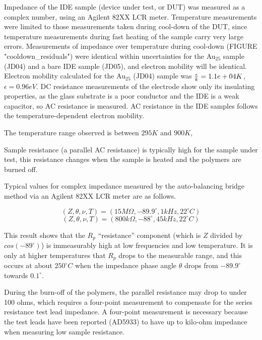     Impedance of the IDE sample (device under test, or DUT) was measured as a complex number, using an Agilent 82XX LCR meter.
    Temperature measurements were limited to those measurements taken during cool-down of the DUT, since temperature measurements during fast heating of the sample carry very large errors.  
    Measurements of impedance over temperature during cool-down (FIGURE "cooldown\_residuals") were identical within uncertainties for the Au$_{25}$ sample (JD04) and a bare IDE sample (JD05), and electron mobility will be identical.  
    Electron mobility calculated for the Au$_25$ (JD04) sample was ${\epsilon\over{k}} = 1.1e+04 K$, $\epsilon = 0.96 eV$.
    DC resistance measurements of the electrode show only its insulating properties, as the glass substrate is a poor conductor and the IDE is a weak capacitor, so AC resistance is measured.
    AC resistance in the IDE samples follows the temperature-dependent electron mobility.

    The temperature range observed is between $295K$ and $900K$, 
    
    Sample resistance (a parallel AC resistance) is typically high for the sample under test, this resistance changes when the sample is heated and the polymers are burned off.  

    
    Typical values for complex impedance measured by the auto-balancing bridge method via an Agilent 82XX LCR meter are as follows.
    
    \begin{equation}
        \left( Z,\theta,\nu,T \right) = \left( 15 M\Omega, -89.9^\circ, 1kHz, 22^{\circ}C \right)
    \end{equation}
    \begin{equation}
        \left( Z, \theta, \nu, T \right) = \left( 800 k\Omega, -88^\circ, 45kHz, 22^{\circ}C \right)
    \end{equation}
    
    This result shows that the $R_p$ ``resistance'' component (which is $Z$ divided by $cos(-89^\circ)$) is immeasurably high at low frequencies and low temperature.  It is only at higher temperatures that $R_p$ drops to the measurable range, and this occurs at about $250^{\circ}C$ when the impedance phase angle $\theta$ drops from $-89.9^\circ$ towards $0.1^\circ$.
    
    During the burn-off of the polymers, the parallel resistance may drop to under 100 ohms, which requires a four-point measurement to compensate for the series resistance test lead impedance.
    A four-point measurement is necessary because the test leads have been reported (AD5933) to have up to kilo-ohm impedance when measuring low sample resistance.




